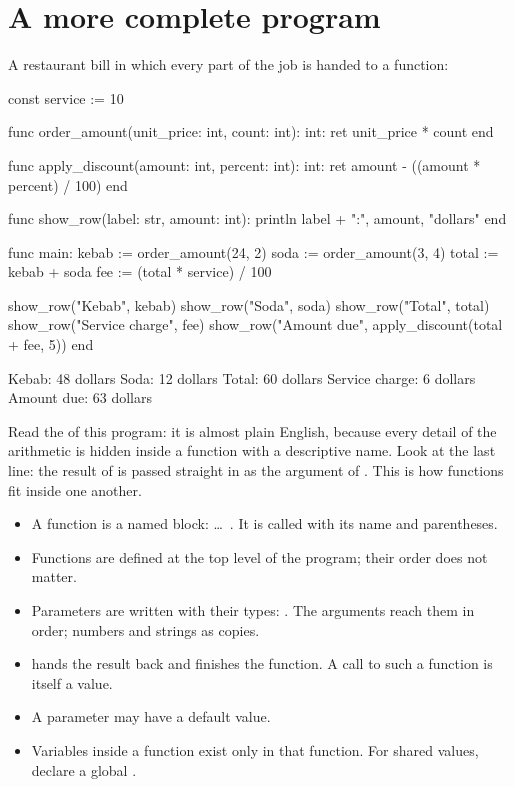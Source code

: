 \section{A more complete program}

A restaurant bill in which every part of the job is handed to a function:

\begin{salamcode}
const service := 10

func order_amount(unit_price: int, count: int): int:
    ret unit_price * count
end

func apply_discount(amount: int, percent: int): int:
    ret amount - ((amount * percent) / 100)
end

func show_row(label: str, amount: int):
    println label + ":", amount, "dollars"
end

func main:
    kebab := order_amount(24, 2)
    soda := order_amount(3, 4)
    total := kebab + soda
    fee := (total * service) / 100

    show_row("Kebab", kebab)
    show_row("Soda", soda)
    show_row("Total", total)
    show_row("Service charge", fee)
    show_row("Amount due", apply_discount(total + fee, 5))
end
\end{salamcode}

\begin{salamout}
Kebab: 48 dollars
Soda: 12 dollars
Total: 60 dollars
Service charge: 6 dollars
Amount due: 63 dollars
\end{salamout}

Read the  of this program: it is almost plain English, because
every detail of the arithmetic is hidden inside a function with a
descriptive name. Look at the last line: the result of
 is passed straight in as the argument of
. This is how functions fit inside one another.

\begin{summary}
\begin{itemize}
  \item A function is a named block: 
        \ldots\ . It is called with its name and parentheses.
  \item Functions are defined at the top level of the program; their order
        does not matter.
  \item Parameters are written with their types: . The
        arguments reach them in order; numbers and strings as copies.
  \item {} hands the result back and finishes the function.
        A call to such a function is itself a value.
  \item A parameter may have a default value.
  \item Variables inside a function exist only in that function. For
        shared values, declare a global .
\end{itemize}
\end{summary}

